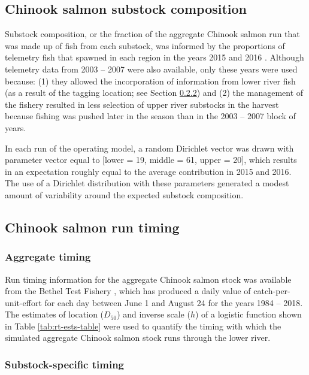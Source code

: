 \documentclass[12pt,]{book}
\theoremstyle{definition}
\theoremstyle{definition}
\theoremstyle{definition}
\theoremstyle{remark}
\begin{document}
\subsection{Chinook salmon substock composition}\label{mse-data-pi}

\noindent
Substock composition, or the fraction of the aggregate Chinook salmon
run that was made up of fish from each substock, was informed by the
proportions of telemetry fish that spawned in each region in the years
2015 and 2016 \citep{smith-liller-2017a, smith-liller-2017b}. Although
telemetry data from 2003 -- 2007 were also available, only these years
were used because: (1) they allowed the incorporation of information
from lower river fish (as a result of the tagging location; see Section
\ref{mse-data-ss-timing}) and (2) the management of the fishery resulted
in less selection of upper river substocks in the harvest because
fishing was pushed later in the season than in the 2003 -- 2007 block of
years.

\noindent
In each run of the operating model, a random Dirichlet vector was drawn
with parameter vector equal to {[}lower = 19, middle = 61, upper =
20{]}, which results in an expectation roughly equal to the average
contribution in 2015 and 2016. The use of a Dirichlet distribution with
these parameters generated a modest amount of variability around the
expected substock composition.

\subsection{Chinook salmon run timing}\label{chinook-salmon-run-timing}

\subsubsection{Aggregate timing}\label{aggregate-timing}

\noindent
Run timing information for the aggregate Chinook salmon stock was
available from the Bethel Test Fishery \citep{bue-lipka-2016}, which has
produced a daily value of catch-per-unit-effort for each day between
June 1 and August 24 for the years 1984 -- 2018. The estimates of
location (\(D_{50}\)) and inverse scale (\(h\)) of a logistic function
shown in Table \ref{tab:rt-ests-table} were used to quantify the timing
with which the simulated aggregate Chinook salmon stock runs through the
lower river.

\subsubsection{Substock-specific timing}\label{mse-data-ss-timing}
\end{document}
